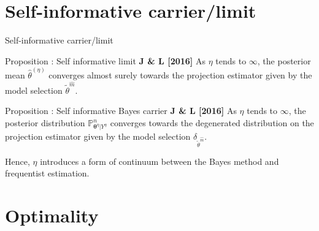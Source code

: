 \documentclass[10pt]{beamer}
\begin{document}
\section{Self-informative carrier/limit}
\begin{frame}{Self-informative carrier/limit}
\begin{block}{Proposition : Self informative limit \textbf{J \& L [2016]}}
As $\eta$ tends to $\infty$, the posterior mean $\widehat{\theta}^{\left(\eta\right)}$ converges almost surely towards the projection estimator given by the model selection $\widetilde{\theta}^{\widehat{m}}.$
\end{block}

\begin{block}{Proposition : Self informative Bayes carrier \textbf{J \& L [2016]}}
As $\eta$ tends to $\infty$, the posterior distribution $\mathbb{P}_{\boldsymbol{\theta}^{\eta}\vert Y^{\eta}}^{n}$ converges towards the degenerated distribution on the projection estimator given by the model selection $\delta_{\widetilde{\theta}^{\widehat{m}}}.$
\end{block}

Hence, $\eta$ introduces a form of continuum between the Bayes method and frequentist estimation.
%
%
%
\end{frame}


\section{Optimality}
\end{document}
